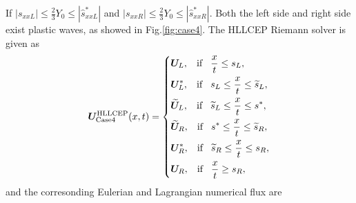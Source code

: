 \documentclass{article}
\numberwithin{equation}{section}
\numberwithin{table}{section}
\begin{document}
If $|s_{xxL}| \le \frac{2}{3}Y_0 \le  |\hat{s}_{xxL}^*|$ and  $|s_{xxR}| \le \frac{2}{3}Y_0 \le  |\hat{s}_{xxR}^*|$. Both  the left side  and right side exist plastic waves, as showed in Fig.\ref{fig:case4}. The HLLCEP Riemann solver is given as
 \begin{equation}
   \bm{U}^{\text{HLLCEP}}_{\text{Case4}}(x,t) = \left\{ \begin{aligned}
		& \bm{U}_L, \hspace{0.3cm} \text{if} \hspace{0.3cm} \frac{x}{t}\le s_L, \\
		& \bm{U}_L^*, \hspace{0.3cm} \text{if} \hspace{0.3cm} s_L\le \frac{x}{t} \le \widetilde{s}_L, \\
		& \widetilde{\bm{U}}_L, \hspace{0.3cm} \text{if} \hspace{0.3cm} \widetilde{s}_L\le \frac{x}{t} \le s^*, \\
		& \widetilde{\bm{U}}_R, \hspace{0.3cm} \text{if} \hspace{0.3cm} s^*\le \frac{x}{t} \le \widetilde{s}_R, \\
		& \bm{U}_R^*, \hspace{0.3cm} \text{if} \hspace{0.3cm} \widetilde{s}_R\le \frac{x}{t} \le s_R,\\
		& \bm{U}_R, \hspace{0.3cm} \text{if} \hspace{0.3cm} \frac{x}{t}\ge s_R, \\
	  \end{aligned}
	\right.
  \end{equation}
  and the corresonding Eulerian and Lagrangian numerical flux are 
\end{document}
